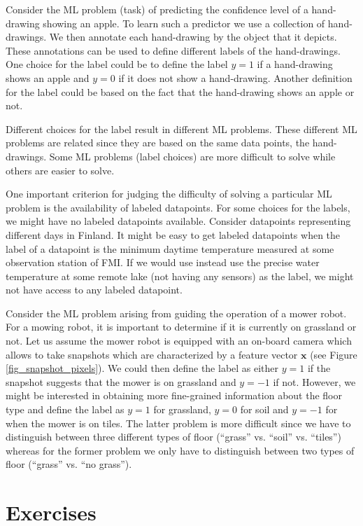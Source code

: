 \documentclass[12pt]{report}
\begin{document}
Consider the ML problem (task) of predicting the confidence level 
of a hand-drawing showing an apple. To learn such a predictor we 
use a collection of hand-drawings. We then annotate each hand-drawing 
by the object that it depicts. These annotations can be used to define 
different labels of the hand-drawings. One choice for the label could 
be to define the label $y=1$ if a hand-drawing shows an apple and 
$y=0$ if it does not show a hand-drawing. Another definition for 
the label could be based on the fact that the hand-drawing shows 
an apple or not. 


Different choices for the label result in different ML problems. These 
different ML problems are related since they are based on the same data 
points, the hand-drawings. Some ML problems (label choices) are more 
difficult to solve while others are easier to solve. 

One important criterion for judging the difficulty of solving a particular ML problem 
is the availability of labeled datapoints. For some choices for the labels, we 
might have no labeled datapoints available. Consider datapoints representing 
different days in Finland. It might be easy to get labeled datapoints when the 
label of a datapoint is the minimum daytime temperature measured at some 
observation station of FMI. If we would use instead use the precise 
water temperature at some remote lake (not having any sensors) as the label, 
we might not have access to any labeled datapoint. 


Consider the ML problem arising from guiding the operation of a mower robot. 
For a mowing robot, it is important to determine if it is currently on grassland 
or not. Let us assume the mower robot is equipped with an on-board camera 
which allows to take snapshots which are characterized by a feature vector 
$\mathbf{x}$ (see Figure \ref{fig_snapshot_pixels}). We could then define the 
label as either $y=1$ if the snapshot suggests that the mower is on grassland 
and $y=-1$ if not. However, we might be interested in obtaining more fine-grained 
information about the floor type and define the label as $y=1$ for grassland, 
$y=0$ for soil and $y=-1$ for when the mower is on tiles. The latter problem is 
more difficult since we have to distinguish between three different types of 
floor (``grass'' vs. ``soil'' vs. ``tiles'') whereas for the former problem we only 
have to distinguish between two types of floor (``grass'' vs. ``no grass''). 


\section{Exercises} 
\end{document}
